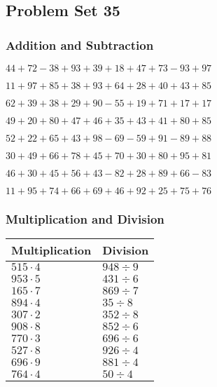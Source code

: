 \hypertarget{problem-set-35}{%
\subsection{Problem Set 35}\label{problem-set-35}}

\hypertarget{addition-and-subtraction}{%
\subsubsection{Addition and
Subtraction}\label{addition-and-subtraction}}

\(44+72-38+93+39+18+47+73-93+97\)

\(11+97+85+38+93+64+28+40+43+85\)

\(62+39+38+29+90-55+19+71+17+17\)

\(49+20+80+47+46+35+43+41+80+85\)

\(52+22+65+43+98-69-59+91-89+88\)

\(30+49+66+78+45+70+30+80+95+81\)

\(46+30+45+56+43-82+28+89+66-83\)

\(11+95+74+66+69+46+92+25+75+76\)

\hypertarget{multiplication-and-division}{%
\subsubsection{Multiplication and
Division}\label{multiplication-and-division}}

\begin{longtable}[]{@{}ll@{}}
\toprule
Multiplication & Division\tabularnewline
\midrule
\endhead
\(515\cdot4\) & \(948÷9\)\tabularnewline
\(953\cdot5\) & \(431÷6\)\tabularnewline
\(165\cdot7\) & \(869÷7\)\tabularnewline
\(894\cdot4\) & \(35÷8\)\tabularnewline
\(307\cdot2\) & \(352÷8\)\tabularnewline
\(908\cdot8\) & \(852÷6\)\tabularnewline
\(770\cdot3\) & \(696÷6\)\tabularnewline
\(527\cdot8\) & \(926÷4\)\tabularnewline
\(696\cdot9\) & \(881÷4\)\tabularnewline
\(764\cdot4\) & \(50÷4\)\tabularnewline
\bottomrule
\end{longtable}
